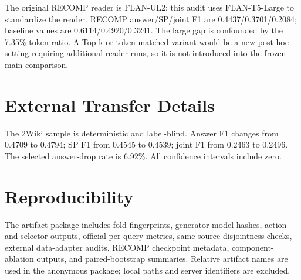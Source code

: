 \documentclass[10pt,twocolumn]{article}
\begin{document}
\begin{table}[t]
\centering
\small
\caption{RECOMP fairness and context-budget audit.}
\label{tab:app-3}
\end{table}

The original RECOMP reader is FLAN-UL2; this audit uses FLAN-T5-Large to standardize the reader. RECOMP answer/SP/joint F1 are 0.4437/0.3701/0.2084; baseline values are 0.6114/0.4920/0.3241. The large gap is confounded by the 7.35\% token ratio. A Top-k or token-matched variant would be a new post-hoc setting requiring additional reader runs, so it is not introduced into the frozen main comparison.

\section{External Transfer Details}

The 2Wiki sample is deterministic and label-blind. Answer F1 changes from 0.4709 to 0.4794; SP F1 from 0.4545 to 0.4539; joint F1 from 0.2463 to 0.2496. The selected answer-drop rate is 6.92\%. All confidence intervals include zero.

\section{Reproducibility}

The artifact package includes fold fingerprints, generator model hashes, action and selector outputs, official per-query metrics, same-source disjointness checks, external data-adapter audits, RECOMP checkpoint metadata, component-ablation outputs, and paired-bootstrap summaries. Relative artifact names are used in the anonymous package; local paths and server identifiers are excluded.
\end{document}
